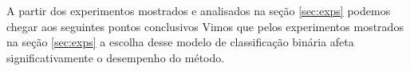 A partir dos experimentos mostrados e analisados na seção \ref{sec:exps} podemos
chegar aos seguintes pontos conclusivos
Vimos que pelos experimentos mostrados na seção \ref{sec:exps}
a escolha desse modelo de classificação binária afeta significativamente o desempenho do método.





\label{sec:conclusions}
